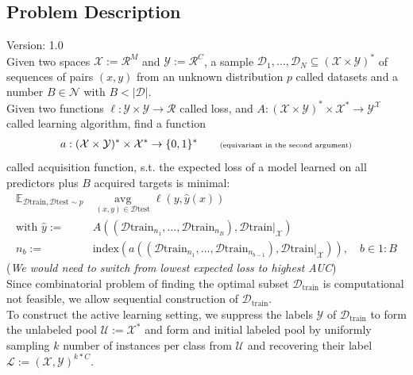 \documentclass[]{article}
\begin{document}
\subsection{Problem Description}
{\color{red} Version: 1.0}\\
Given two spaces $\mathcal{X}:=\mathcal{R}^M$ and $\mathcal{Y}:=\mathcal{R}^C$, a sample $\mathcal{D}_1,\ldots,\mathcal{D}_N \subseteq (\mathcal{X}\times \mathcal{Y})^*$ of sequences of pairs $(x,y)$  from an unknown distribution $p$ called datasets and a number $B\in\mathcal{N}$ with $B < |\mathcal{D}|$. \\
Given two functions $\ell:\mathcal{Y}\times \mathcal{Y}\rightarrow \mathcal{R}$ called loss, and $A: (\mathcal{X} \times \mathcal{Y})^* \times \mathcal{X}^* \rightarrow \mathcal{Y}^{\mathcal{X}}$ called learning algorithm, find a function
\begin{align*}
	a: (\mathcal{X}\times \mathcal{Y})^* \times \mathcal{X}^* \rightarrow \{0,1\}^*
	\quad\quad \text{\tiny (equivariant in the second argument)}
\end{align*}
called acquisition function, s.t. the expected loss of a model learned on all predictors plus $B$ acquired targets is minimal:
\begin{align*}
	\mathbb{E}_{\mathcal{D}\text{train},\mathcal{D}\text{test}\sim p}   &
	\operatorname{avg}\limits_{(x,y)\in\mathcal{D}\text{test}}
	\ell(y, \hat y(x)) 
	\\
	\text{with }
	\hat y:= & A( (\mathcal{D}\text{train}_{n_1},\ldots,\mathcal{D}\text{train}_{n_B}), \mathcal{D}\text{train}|_{\mathcal{X}})
	\\ 
	n_b := & \text{index}( a( (\mathcal{D}\text{train}_{n_1},\ldots,\mathcal{D}\text{train}_{n_{b-1}}), \mathcal{D}\text{train}|_{\mathcal{X}}) ),
	\quad b\in 1{:}B
\end{align*}
(\textit{We would need to switch from lowest expected loss to highest AUC}) \\
Since combinatorial problem of finding the optimal subset $\mathcal{D}_\text{train}$ is computational not feasible, we allow sequential construction of $\mathcal{D}_\text{train}$. \\ [2mm]
%
To construct the active learning setting, we suppress the labels $\mathcal{Y}$ of $\mathcal{D}_\text{train}$ to form the unlabeled pool $\mathcal{U} := \mathcal{X}^*$ and form and initial labeled pool by uniformly sampling $k$ number of instances per class from $\mathcal{U}$ and recovering their label $\mathcal{L} := (\mathcal{X}, \mathcal{Y})^{k*C}$. \\ [2mm]
\end{document}
